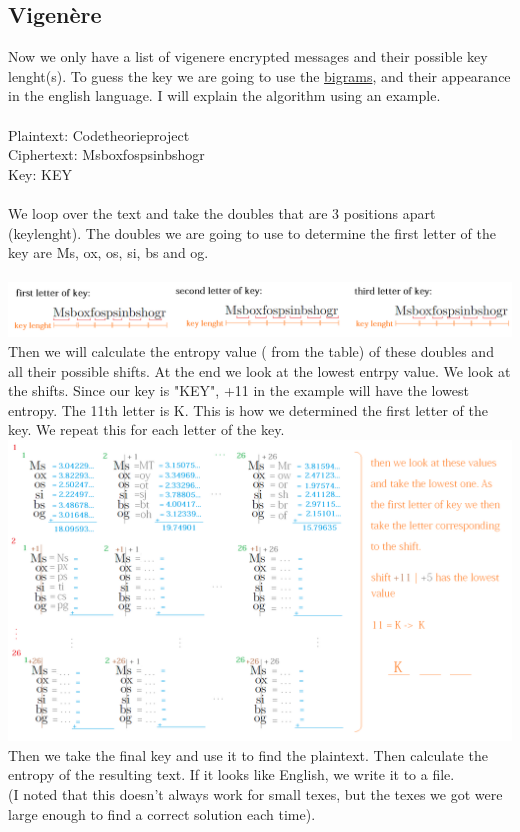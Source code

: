\documentclass{article}
\begin{document}
\subsection{Vigenère}
Now we only have a list of vigenere encrypted messages and their possible key lenght(s). To guess the key we are going to use the \href{http://practicalcryptography.com/media/cryptanalysis/files/english_bigrams_1.txt}{bigrams}, and their appearance in the english language. I will explain the algorithm using an example.\\
\\
Plaintext: Codetheorieproject\\
Ciphertext: Msboxfospsinbshogr\\
Key: KEY\\
\\
We loop over the text and take the doubles that are 3 positions apart (keylenght). The doubles we are going to use to determine the first letter of the key are Ms, ox, os, si, bs and og.\\
\\
\hspace*{-0.5in}
\includegraphics[scale=0.60]{image1.png}
\\
Then we will calculate the entropy value ( from the table) of these doubles and all their possible shifts. At the end we look at the lowest entrpy value. We look at the shifts. Since our key is "KEY", +11 in the example will have the lowest entropy. The 11th letter is K. This is how we determined the first letter of the key. We repeat this for each letter of the key.\\
\hspace*{-0.5in}
\includegraphics[scale=0.60]{image2.png}
\\
Then we take the final key and use it to find the plaintext. Then calculate the entropy of the resulting text. If it looks like English, we write it to a file. \\
(I noted that this doesn't always work for small texes, but the texes we got were large enough to find a correct solution each time).
\end{document}
